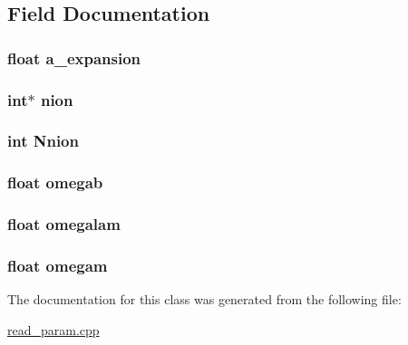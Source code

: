 \subsection{Field Documentation}
\hypertarget{classread__param_ab8ae1614d88a1fdcded37c8573053e9c}{
\subsubsection[{a\+\_\+expansion}]{\setlength{\rightskip}{0pt plus 5cm}float a\+\_\+expansion}}\label{classread__param_ab8ae1614d88a1fdcded37c8573053e9c}
\hypertarget{classread__param_afaa56aa1d8568629cd222be6cce900b7}{
\subsubsection[{nion}]{\setlength{\rightskip}{0pt plus 5cm}int$\ast$ nion}}\label{classread__param_afaa56aa1d8568629cd222be6cce900b7}
\hypertarget{classread__param_ab6d8d0b2c7ee385271e90e51818623bc}{
\subsubsection[{Nnion}]{\setlength{\rightskip}{0pt plus 5cm}int Nnion}}\label{classread__param_ab6d8d0b2c7ee385271e90e51818623bc}
\hypertarget{classread__param_aeaccd726adbb20f37e40458f9fc1789c}{
\subsubsection[{omegab}]{\setlength{\rightskip}{0pt plus 5cm}float omegab}}\label{classread__param_aeaccd726adbb20f37e40458f9fc1789c}
\hypertarget{classread__param_ac99cfe381d57df39c2cdb6d5c8f6f548}{
\subsubsection[{omegalam}]{\setlength{\rightskip}{0pt plus 5cm}float omegalam}}\label{classread__param_ac99cfe381d57df39c2cdb6d5c8f6f548}
\hypertarget{classread__param_a1143ccc333b13b81d68f112fc1122acd}{
\subsubsection[{omegam}]{\setlength{\rightskip}{0pt plus 5cm}float omegam}}\label{classread__param_a1143ccc333b13b81d68f112fc1122acd}


The documentation for this class was generated from the following file\+:\begin{DoxyCompactItemize}
\item 
\hyperlink{read__param_8cpp}{read\+\_\+param.\+cpp}\end{DoxyCompactItemize}
